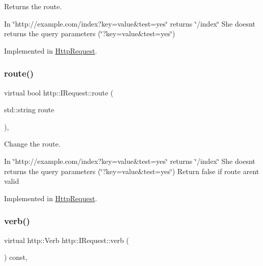 Returns the route. 

In \char`\"{}http\+://example.\+com/index?key=value\&test=yes\char`\"{} returns \char`\"{}/index\char`\"{} She doesn\textquotesingle{}t returns the query parameters (\char`\"{}?key=value\&test=yes\char`\"{}) 

Implemented in \hyperlink{classHttpRequest_a313930a1717c2635ad092b7f6c7d2460}{Http\+Request}.

\mbox{\label{structhttp_1_1IRequest_a76f3dfba1e9396a0865ea133af371b80}} 
\subsubsection{\texorpdfstring{route()}{route()}\hspace{0.1cm}{\footnotesize\ttfamily [2/2]}}
{\footnotesize\ttfamily virtual bool http\+::\+I\+Request\+::route (\begin{DoxyParamCaption}\item[{std\+::string}]{route }\end{DoxyParamCaption})\hspace{0.3cm}{\ttfamily [pure virtual]}, {\ttfamily [noexcept]}}



Change the route. 

In \char`\"{}http\+://example.\+com/index?key=value\&test=yes\char`\"{} returns \char`\"{}/index\char`\"{} She doesn\textquotesingle{}t returns the query parameters (\char`\"{}?key=value\&test=yes\char`\"{}) Return false if route aren\textquotesingle{}t valid 

Implemented in \hyperlink{classHttpRequest_aa71843738db71fe1f826bd30fbf5bb29}{Http\+Request}.

\mbox{\label{structhttp_1_1IRequest_aef9304b69674a5c9873a33564b51d527}} 
\subsubsection{\texorpdfstring{verb()}{verb()}\hspace{0.1cm}{\footnotesize\ttfamily [1/2]}}
{\footnotesize\ttfamily virtual http\+::\+Verb http\+::\+I\+Request\+::verb (\begin{DoxyParamCaption}{ }\end{DoxyParamCaption}) const\hspace{0.3cm}{\ttfamily [pure virtual]}, {\ttfamily [noexcept]}}




